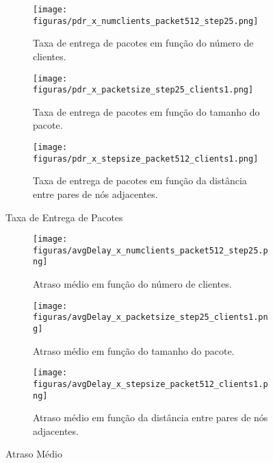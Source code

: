 \documentclass[letterpaper, 10 pt, conference]{ieeeconf}  %
\begin{document}
\begin{figure*}[!ht]
\centering
   \begin{subfigure}[b]{0.30\textwidth}
        \texttt{[image: figuras/pdr\_x\_numclients\_packet512\_step25.png]}
        \caption{Taxa de entrega de pacotes em função do número de clientes.}
        \label{fig:pdrxnumClients}
    \end{subfigure}
       \begin{subfigure}[b]{0.30\textwidth}
        \texttt{[image: figuras/pdr\_x\_packetsize\_step25\_clients1.png]}
        \caption{Taxa de entrega de pacotes em função do tamanho do pacote.}
        \label{fig:pdrxpacketSize}
    \end{subfigure}
       \begin{subfigure}[b]{0.30\textwidth}
        \texttt{[image: figuras/pdr\_x\_stepsize\_packet512\_clients1.png]}
        \caption{Taxa de entrega de pacotes em função da distância entre pares de nós adjacentes.}
        \label{fig:pdrxstepSize}
    \end{subfigure}
\caption{Taxa de Entrega de Pacotes}
\label{fig:pdr}
\end{figure*}

\begin{figure*}[!ht]
\centering
   \begin{subfigure}[b]{0.30\textwidth}
        \texttt{[image: figuras/avgDelay\_x\_numclients\_packet512\_step25.png]}
        \caption{Atraso médio em função do número de clientes.}
        \label{fig:avgDelayxnumClients}
    \end{subfigure}
       \begin{subfigure}[b]{0.30\textwidth}
        \texttt{[image: figuras/avgDelay\_x\_packetsize\_step25\_clients1.png]}
        \caption{Atraso médio em função do tamanho do pacote.}
        \label{fig:avgDelayxpacketSize}
    \end{subfigure}
       \begin{subfigure}[b]{0.30\textwidth}
        \texttt{[image: figuras/avgDelay\_x\_stepsize\_packet512\_clients1.png]}
        \caption{Atraso médio em função da distância entre pares de nós adjacentes.}
        \label{fig:avgDelayxstepSize}
    \end{subfigure}
\caption{Atraso Médio}
\label{fig:avgDelay}
\end{figure*}
\end{document}
